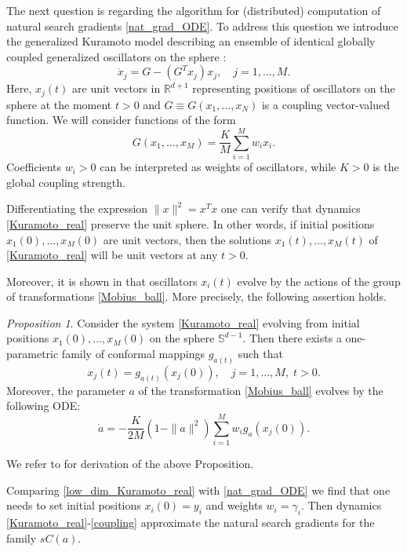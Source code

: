 \documentclass{article}
\theoremstyle{plain}%
\theoremstyle{definition}
\theoremstyle{remark}
\theoremstyle{prop}
\newtheorem{prop}{Proposition}
\begin{document}
The next question is regarding the algorithm for (distributed) computation of natural search gradients \eqref{nat_grad_ODE}. To address this question we introduce the generalized Kuramoto model describing an ensemble of identical globally coupled generalized oscillators on the sphere \cite{LMS}:
\begin{equation}
\label{Kuramoto_real}
\dot x_j = G - (G^T x_j) x_j, \quad j=1,\dots,M.
\end{equation} 
Here, $x_j(t)$ are unit vectors in ${\mathbb R}^{d+1}$ representing positions of oscillators on the sphere at the moment $t>0$ and $G \equiv G(x_1,\dots,x_N)$ is a coupling vector-valued function. We will consider functions of the form 
\begin{equation}
\label{coupling}
G(x_1,\dots,x_M) = \frac{K}{M} \sum_{i=1}^M w_i x_i.
\end{equation}
Coefficients $w_i > 0$ can be interpreted as weights of oscillators, while $K>0$ is the global coupling strength.

Differentiating the expression $\| x \|^2 = x^T x$ one can verify that dynamics \eqref{Kuramoto_real} preserve the unit sphere. In other words, if initial positions $x_1(0),\dots,x_M(0)$ are unit vectors, then the solutions $x_1(t),\dots,x_M(t)$ of \eqref{Kuramoto_real} will be unit vectors at any $t>0$.

Moreover, it is shown in \cite{LMS} that oscillators $x_i(t)$ evolve by the actions of the group of transformations \eqref{Mobius_ball}. More precisely, the following assertion holds.

\begin{prop}
Consider the system \eqref{Kuramoto_real} evolving from initial positions $x_1(0),\dots,x_M(0)$ on the sphere ${\mathbb S}^{d-1}$. Then there exists a one-parametric family of conformal mappings $g_{a(t)}$ such that
$$
x_j(t) = g_{a(t)}(x_j(0)), \quad j=1,\dots,M, \; t>0.
$$
Moreover, the parameter $a$ of the transformation \eqref{Mobius_ball} evolves by the following ODE:
\begin{equation}
\label{low_dim_Kuramoto_real}
\dot a = - \frac{K}{2M} (1 - \| a \|^2) \sum_{i=1}^M w_i g_a(x_j(0)). 
\end{equation}
\end{prop}

We refer to \cite{LMS} for derivation of the above Proposition.


Comparing \eqref{low_dim_Kuramoto_real} with \eqref{nat_grad_ODE} we find that one needs to set initial positions $x_i(0) = y_i$ and weights $w_i = \gamma_i$. Then dynamics \eqref{Kuramoto_real}-\eqref{coupling} approximate the natural search gradients for the family $sC(a)$.
\end{document}
